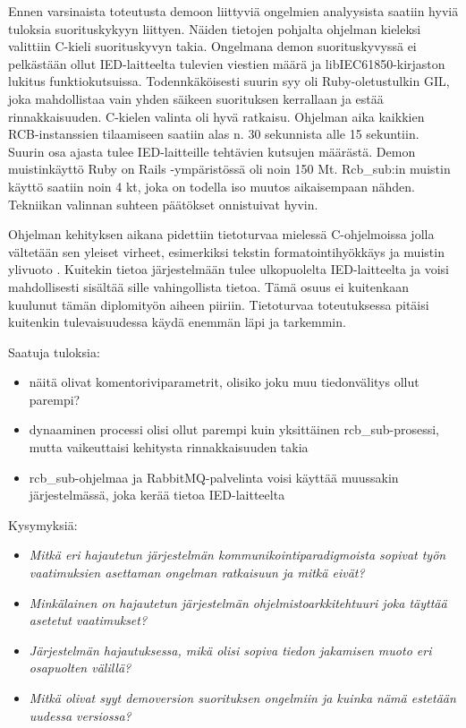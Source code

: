 Ennen varsinaista toteutusta demoon liittyviä ongelmien analyysista saatiin hyviä tuloksia suorituskykyyn liittyen. Näiden tietojen pohjalta ohjelman kieleksi valittiin C-kieli suorituskyvyn takia. Ongelmana demon suorituskyvyssä ei pelkästään ollut IED-laitteelta tulevien viestien määrä ja libIEC61850-kirjaston lukitus funktiokutsuissa. Todennkäköisesti suurin syy oli Ruby-oletustulkin GIL, joka mahdollistaa vain yhden säikeen suorituksen kerrallaan ja estää rinnakkaisuuden. C-kielen valinta oli hyvä ratkaisu. Ohjelman aika kaikkien RCB-instanssien tilaamiseen saatiin alas n. 30 sekunnista alle 15 sekuntiin. Suurin osa ajasta tulee IED-laitteille tehtävien kutsujen määrästä. Demon muistinkäyttö Ruby on Rails -ympäristössä oli noin 150 Mt. Rcb\_sub:in muistin käyttö saatiin noin 4 kt, joka on todella iso muutos aikaisempaan nähden. Tekniikan valinnan suhteen päätökset onnistuivat hyvin.

Ohjelman kehityksen aikana pidettiin tietoturvaa mielessä C-ohjelmoissa jolla vältetään sen yleiset virheet, esimerkiksi tekstin formatointihyökkäys \cite{format-string-attack} ja muistin ylivuoto \cite{buffer-overflow-attack}. Kuitekin tietoa järjestelmään tulee ulkopuolelta IED-laitteelta ja voisi mahdollisesti sisältää sille vahingollista tietoa. Tämä osuus ei kuitenkaan kuulunut tämän diplomityön aiheen piiriin. Tietoturvaa toteutuksessa pitäisi kuitenkin tulevaisuudessa käydä enemmän läpi ja tarkemmin.



Saatuja tuloksia:
\begin{itemize}
	\item näitä olivat komentoriviparametrit, olisiko joku muu tiedonvälitys ollut parempi?
	\item dynaaminen processi olisi ollut parempi kuin yksittäinen rcb\_sub-prosessi, mutta vaikeuttaisi kehitysta rinnakkaisuuden takia
	\item rcb\_sub-ohjelmaa ja RabbitMQ-palvelinta voisi käyttää muussakin järjestelmässä, joka kerää tietoa IED-laitteelta
\end{itemize}

Kysymyksiä:
\begin{itemize}
	\item \emph{Mitkä eri hajautetun järjestelmän kommunikointiparadigmoista sopivat työn vaatimuksien asettaman ongelman ratkaisuun ja mitkä eivät?}
	\item \emph{Minkälainen on hajautetun järjestelmän ohjelmistoarkkitehtuuri joka täyttää asetetut vaatimukset?}
	\item \emph{Järjestelmän hajautuksessa, mikä olisi sopiva tiedon jakamisen muoto eri osapuolten välillä?}
	\item \emph{Mitkä olivat syyt demoversion suorituksen ongelmiin ja kuinka nämä estetään uudessa versiossa?}
\end{itemize}